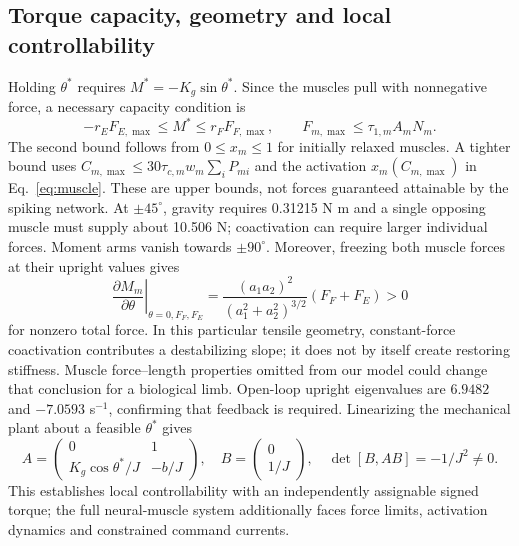 \documentclass{styles/svproc}
\begin{document}
\subsection{Torque capacity, geometry and local controllability}
Holding $\theta^*$ requires $M^*=-K_g\sin\theta^*$. Since the muscles pull with nonnegative force, a necessary capacity condition is
\begin{equation}
 -r_EF_{E,\max}\le M^*\le r_FF_{F,\max},\qquad
 F_{m,\max}\le\tau_{1,m}A_mN_m.
 \label{eq:capacity}
\end{equation}
The second bound follows from $0\le x_m\le1$ for initially relaxed muscles. A tighter bound uses $C_{m,\max}\le30\tau_{c,m}w_m\sum_iP_{mi}$ and the activation $x_m(C_{m,\max})$ in Eq.~\ref{eq:muscle}. These are upper bounds, not forces guaranteed attainable by the spiking network. At $\pm45^\circ$, gravity requires 0.31215 N m and a single opposing muscle must supply about 10.506 N; coactivation can require larger individual forces. Moment arms vanish towards $\pm90^\circ$. Moreover, freezing both muscle forces at their upright values gives
\begin{equation}
 \left.\frac{\partial M_m}{\partial\theta}\right|_{\theta=0,F_F,F_E}
 =\frac{(a_1a_2)^2}{(a_1^2+a_2^2)^{3/2}}(F_F+F_E)>0
 \label{eq:coactivation}
\end{equation}
for nonzero total force. In this particular tensile geometry, constant-force coactivation contributes a destabilizing slope; it does not by itself create restoring stiffness. Muscle force--length properties omitted from our model could change that conclusion for a biological limb. Open-loop upright eigenvalues are $6.9482$ and $-7.0593$ s$^{-1}$, confirming that feedback is required. Linearizing the mechanical plant about a feasible $\theta^*$ gives
\begin{equation}
 A=\begin{pmatrix}0&1\\K_g\cos\theta^*/J&-b/J\end{pmatrix},\quad
 B=\begin{pmatrix}0\\1/J\end{pmatrix},\quad\det[B,AB]=-1/J^2\ne0.
 \label{eq:controllability}
\end{equation}
This establishes local controllability with an independently assignable signed torque; the full neural-muscle system additionally faces force limits, activation dynamics and constrained command currents.
\end{document}
